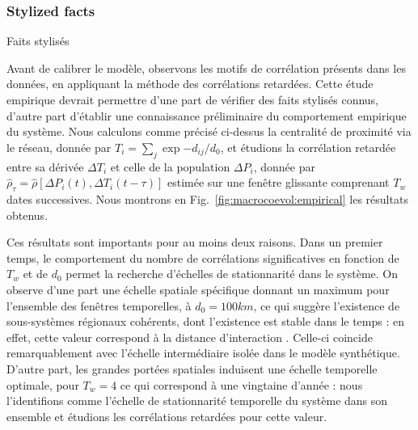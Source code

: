 



\subsubsection{Stylized facts}{Faits stylisés}


Avant de calibrer le modèle, observons les motifs de corrélation présents dans les données, en appliquant la méthode des corrélations retardées. Cette étude empirique devrait permettre d'une part de vérifier des faits stylisés connus, d'autre part d'établir une connaissance préliminaire du comportement empirique du système. Nous calculons comme précisé ci-dessus la centralité de proximité via le réseau, donnée par $T_i = \sum_j \exp{-d_{ij}/d_0}$, et étudions la corrélation retardée entre sa dérivée $\Delta T_i$ et celle de la population $\Delta P_i$, donnée par $\hat{\rho}_{\tau} = \hat{\rho}\left[\Delta P_i(t),\Delta T_i(t-\tau)\right]$ estimée sur une fenêtre glissante comprenant $T_w$ dates successives. Nous montrons en Fig.~\ref{fig:macrocoevol:empirical} les résultats obtenus.


Ces résultats sont importants pour au moins deux raisons. Dans un premier temps, le comportement du nombre de corrélations significatives en fonction de $T_w$ et de $d_0$ permet la recherche d'échelles de stationnarité dans le système. On observe d'une part une échelle spatiale spécifique donnant un maximum pour l'ensemble des fenêtres temporelles, à $d_0 = 100km$, ce qui suggère l'existence de sous-systèmes régionaux cohérents, dont l'existence est stable dans le temps : en effet, cette valeur correspond à la distance d'interaction . Celle-ci coincide remarquablement avec l'échelle intermédiaire isolée dans le modèle synthétique. D'autre part, les grandes portées spatiales induisent une échelle temporelle optimale, pour $T_w = 4$ ce qui correspond à une vingtaine d'année : nous l'identifions comme l'échelle de stationnarité temporelle du système dans son ensemble et étudions les corrélations retardées pour cette valeur.



